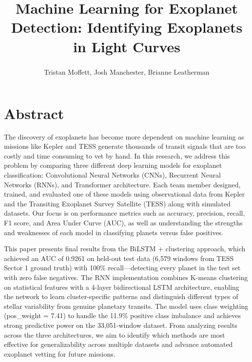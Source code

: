 \documentclass[letterpaper]{article} %
\title{Machine Learning for Exoplanet Detection: Identifying Exoplanets in Light Curves}
\author {
    Tristan Moffett\textsuperscript{\rm },
    Josh Manchester\textsuperscript{\rm },
    Brianne Leatherman\textsuperscript{\rm }
}
\begin{document}
\maketitle

\section*{Abstract}
The discovery of exoplanets has become more dependent on machine learning as missions like Kepler and TESS generate thousands of transit signals that are too costly and time consuming to vet by hand. In this research, we address this problem by comparing three different deep learning models for exoplanet classification: Convolutional Neural Networks (CNNs), Recurrent Neural Networks (RNNs), and Transformer architecture. Each team member designed, trained, and evaluated one of these models using observational data from Kepler and the Transiting Exoplanet Survey Satellite (TESS) along with simulated datasets. Our focus is on performance metrics such as accuracy, precision, recall, F1 score, and Area Under Curve (AUC), as well as understanding the strengths and weaknesses of each model in classifying planets versus false positives.

This paper presents final results from the BiLSTM + clustering approach, which achieved an AUC of 0.9261 on held-out test data (6,579 windows from TESS Sector 1 ground truth) with 100\% recall---detecting every planet in the test set with zero false negatives. The RNN implementation combines K-means clustering on statistical features with a 4-layer bidirectional LSTM architecture, enabling the network to learn cluster-specific patterns and distinguish different types of stellar variability from genuine planetary transits. The model uses class weighting (pos\_weight = 7.41) to handle the 11.9\% positive class imbalance and achieves strong predictive power on the 33,051-window dataset. From analyzing results across the three architectures, we aim to identify which methods are most effective for generalizability across multiple datasets and advance automated exoplanet vetting for future missions.
\end{document}
